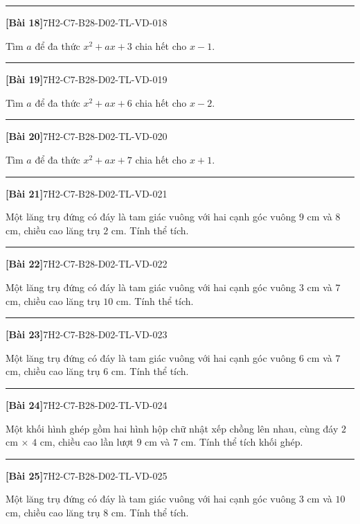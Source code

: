 \documentclass[12pt,a4paper]{article}
\newif\ifloigiai
\newenvironment{cauhoi}[2]{%
  \par\medskip\noindent\rule{\textwidth}{0.4pt}\par\nopagebreak
  \noindent\textbf{[#1]}\hfill{\scriptsize\ttfamily #2}\par\nopagebreak\smallskip}{\par}
\newcommand{\loigiai}[1]{\ifloigiai\par\smallskip\noindent\textit{Lời giải.} #1\par\fi}
\begin{document}
\begin{cauhoi}{Bài 18}{7H2-C7-B28-D02-TL-VD-018}
Tìm $a$ để đa thức $x^{2}+ax+3$ chia hết cho $x-1$.
\loigiai{Đa thức chia hết cho $x-1$ khi $x=1$ là nghiệm: $1+a+3=0$, suy ra $a=-4$.}
\end{cauhoi}
\begin{cauhoi}{Bài 19}{7H2-C7-B28-D02-TL-VD-019}
Tìm $a$ để đa thức $x^{2}+ax+6$ chia hết cho $x-2$.
\loigiai{Đa thức chia hết cho $x-2$ khi $x=2$ là nghiệm: $4+2a+6=0$, suy ra $a=-5$.}
\end{cauhoi}
\begin{cauhoi}{Bài 20}{7H2-C7-B28-D02-TL-VD-020}
Tìm $a$ để đa thức $x^{2}+ax+7$ chia hết cho $x+1$.
\loigiai{Đa thức chia hết cho $x+1$ khi $x=-1$ là nghiệm: $1-a+7=0$, suy ra $a=8$.}
\end{cauhoi}
\begin{cauhoi}{Bài 21}{7H2-C7-B28-D02-TL-VD-021}
Một lăng trụ đứng có đáy là tam giác vuông với hai cạnh góc vuông $9$ cm và $8$ cm, chiều cao lăng trụ $2$ cm. Tính thể tích.
\loigiai{Diện tích đáy là $\dfrac{9\cdot 8}{2}=36$ ($\text{cm}^2$). Thể tích là $36\cdot 2=72$ ($\text{cm}^3$).}
\end{cauhoi}
\begin{cauhoi}{Bài 22}{7H2-C7-B28-D02-TL-VD-022}
Một lăng trụ đứng có đáy là tam giác vuông với hai cạnh góc vuông $3$ cm và $7$ cm, chiều cao lăng trụ $10$ cm. Tính thể tích.
\loigiai{Diện tích đáy là $\dfrac{3\cdot 7}{2}=10,5$ ($\text{cm}^2$). Thể tích là $10,5\cdot 10=105$ ($\text{cm}^3$).}
\end{cauhoi}
\begin{cauhoi}{Bài 23}{7H2-C7-B28-D02-TL-VD-023}
Một lăng trụ đứng có đáy là tam giác vuông với hai cạnh góc vuông $6$ cm và $7$ cm, chiều cao lăng trụ $6$ cm. Tính thể tích.
\loigiai{Diện tích đáy là $\dfrac{6\cdot 7}{2}=21$ ($\text{cm}^2$). Thể tích là $21\cdot 6=126$ ($\text{cm}^3$).}
\end{cauhoi}
\begin{cauhoi}{Bài 24}{7H2-C7-B28-D02-TL-VD-024}
Một khối hình ghép gồm hai hình hộp chữ nhật xếp chồng lên nhau, cùng đáy $2$ cm $\times$ $4$ cm, chiều cao lần lượt $9$ cm và $7$ cm. Tính thể tích khối ghép.
\loigiai{Thể tích hai khối là $2\cdot 4\cdot 9=72$ và $2\cdot 4\cdot 7=56$ ($\text{cm}^3$). Thể tích khối ghép là $72+56=128$ ($\text{cm}^3$).}
\end{cauhoi}
\begin{cauhoi}{Bài 25}{7H2-C7-B28-D02-TL-VD-025}
Một lăng trụ đứng có đáy là tam giác vuông với hai cạnh góc vuông $3$ cm và $10$ cm, chiều cao lăng trụ $8$ cm. Tính thể tích.
\loigiai{Diện tích đáy là $\dfrac{3\cdot 10}{2}=15$ ($\text{cm}^2$). Thể tích là $15\cdot 8=120$ ($\text{cm}^3$).}
\end{cauhoi}
\end{document}
